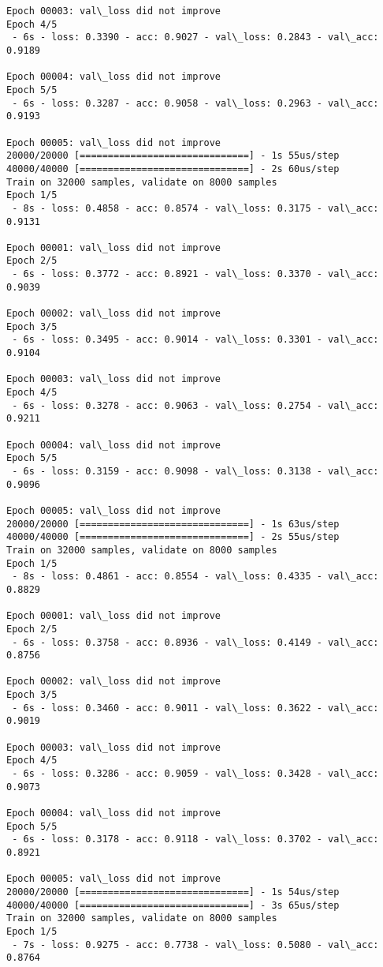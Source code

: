 \documentclass[11pt]{article}
\begin{document}
\begin{Verbatim}[commandchars=\\\{\}]
Epoch 00003: val\_loss did not improve
Epoch 4/5
 - 6s - loss: 0.3390 - acc: 0.9027 - val\_loss: 0.2843 - val\_acc: 0.9189

Epoch 00004: val\_loss did not improve
Epoch 5/5
 - 6s - loss: 0.3287 - acc: 0.9058 - val\_loss: 0.2963 - val\_acc: 0.9193

Epoch 00005: val\_loss did not improve
20000/20000 [==============================] - 1s 55us/step
40000/40000 [==============================] - 2s 60us/step
Train on 32000 samples, validate on 8000 samples
Epoch 1/5
 - 8s - loss: 0.4858 - acc: 0.8574 - val\_loss: 0.3175 - val\_acc: 0.9131

Epoch 00001: val\_loss did not improve
Epoch 2/5
 - 6s - loss: 0.3772 - acc: 0.8921 - val\_loss: 0.3370 - val\_acc: 0.9039

Epoch 00002: val\_loss did not improve
Epoch 3/5
 - 6s - loss: 0.3495 - acc: 0.9014 - val\_loss: 0.3301 - val\_acc: 0.9104

Epoch 00003: val\_loss did not improve
Epoch 4/5
 - 6s - loss: 0.3278 - acc: 0.9063 - val\_loss: 0.2754 - val\_acc: 0.9211

Epoch 00004: val\_loss did not improve
Epoch 5/5
 - 6s - loss: 0.3159 - acc: 0.9098 - val\_loss: 0.3138 - val\_acc: 0.9096

Epoch 00005: val\_loss did not improve
20000/20000 [==============================] - 1s 63us/step
40000/40000 [==============================] - 2s 55us/step
Train on 32000 samples, validate on 8000 samples
Epoch 1/5
 - 8s - loss: 0.4861 - acc: 0.8554 - val\_loss: 0.4335 - val\_acc: 0.8829

Epoch 00001: val\_loss did not improve
Epoch 2/5
 - 6s - loss: 0.3758 - acc: 0.8936 - val\_loss: 0.4149 - val\_acc: 0.8756

Epoch 00002: val\_loss did not improve
Epoch 3/5
 - 6s - loss: 0.3460 - acc: 0.9011 - val\_loss: 0.3622 - val\_acc: 0.9019

Epoch 00003: val\_loss did not improve
Epoch 4/5
 - 6s - loss: 0.3286 - acc: 0.9059 - val\_loss: 0.3428 - val\_acc: 0.9073

Epoch 00004: val\_loss did not improve
Epoch 5/5
 - 6s - loss: 0.3178 - acc: 0.9118 - val\_loss: 0.3702 - val\_acc: 0.8921

Epoch 00005: val\_loss did not improve
20000/20000 [==============================] - 1s 54us/step
40000/40000 [==============================] - 3s 65us/step
Train on 32000 samples, validate on 8000 samples
Epoch 1/5
 - 7s - loss: 0.9275 - acc: 0.7738 - val\_loss: 0.5080 - val\_acc: 0.8764


\end{Verbatim}
\end{document}
